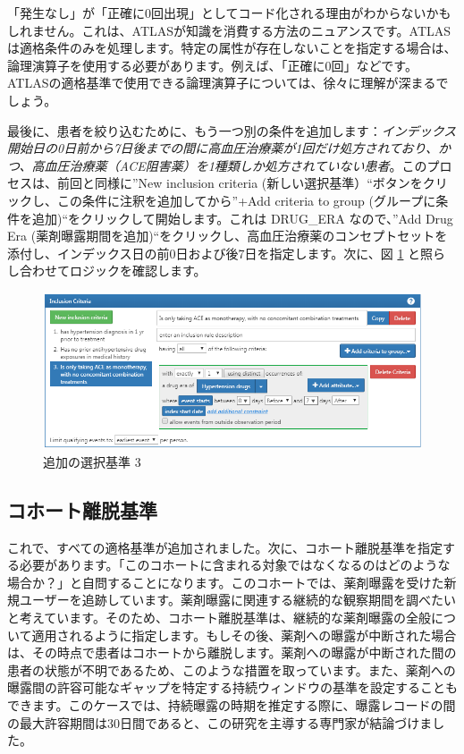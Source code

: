 \documentclass[
  11pt]{book}
\theoremstyle{definition}
\theoremstyle{definition}
\theoremstyle{definition}
\theoremstyle{definition}
\theoremstyle{remark}
\begin{document}
「発生なし」が「正確に0回出現」としてコード化される理由がわからないかもしれません。これは、ATLASが知識を消費する方法のニュアンスです。ATLAS は適格条件のみを処理します。特定の属性が存在しないことを指定する場合は、論理演算子を使用する必要があります。例えば、「正確に0回」などです。ATLASの適格基準で使用できる論理演算子については、徐々に理解が深まるでしょう。

最後に、患者を絞り込むために、もう一つ別の条件を追加します：\emph{インデックス開始日の0日前から7日後までの間に高血圧治療薬が1回だけ処方されており、かつ、高血圧治療薬（ACE阻害薬）を1種類しか処方されていない患者}。このプロセスは、前回と同様に''New inclusion criteria (新しい選択基準）``ボタンをクリックし、この条件に注釈を追加してから''+Add criteria to group (グループに条件を追加)``をクリックして開始します。これは DRUG\_ERA なので、''Add Drug Era (薬剤曝露期間を追加)``をクリックし、高血圧治療薬のコンセプトセットを添付し、インデックス日の前0日および後7日を指定します。次に、図 \ref{fig:ATLASIC3} と照らし合わせてロジックを確認します。

\begin{figure}

{\centering \includegraphics[width=1\linewidth]{images/Cohorts/ATLAS-IC3} 

}

\caption{追加の選択基準 3}\label{fig:ATLASIC3}
\end{figure}

\subsection{コホート離脱基準}\label{ux30b3ux30dbux30fcux30c8ux96e2ux8131ux57faux6e96}

これで、すべての適格基準が追加されました。次に、コホート離脱基準を指定する必要があります。「このコホートに含まれる対象ではなくなるのはどのような場合か？」と自問することになります。このコホートでは、薬剤曝露を受けた新規ユーザーを追跡しています。薬剤曝露に関連する継続的な観察期間を調べたいと考えています。そのため、コホート離脱基準は、継続的な薬剤曝露の全般について適用されるように指定します。もしその後、薬剤への曝露が中断された場合は、その時点で患者はコホートから離脱します。薬剤への曝露が中断された間の患者の状態が不明であるため、このような措置を取っています。また、薬剤への曝露間の許容可能なギャップを特定する持続ウィンドウの基準を設定することもできます。このケースでは、持続曝露の時期を推定する際に、曝露レコードの間の最大許容期間は30日間であると、この研究を主導する専門家が結論づけました。
\end{document}
